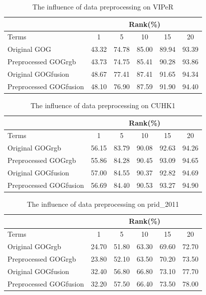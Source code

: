 \documentclass[conference,compsoc]{IEEEtran}
\begin{document}
\begin{table}[H]
\caption{The influence of data preprocessing on VIPeR}
\begin{tabular}{|l|c|c|c|c|c|}
\hline
 & \multicolumn{5}{|c|}{Rank(\%)} \\
 \hline
Terms  &1 &5 & 10 &15& 20\\
\hline
Original GOG &43.32&74.78& 85.00& 89.94& 93.39 \\
\hline
Preprocessed GOGrgb &43.73&74.75&85.41& 90.28&93.86\\
 \hline
Original GOGfusion &48.67&77.41&87.41&91.65&94.34\\
\hline
Preprocessed GOGfusion &48.10&76.90&87.59&91.90& 94.40\\
 \hline
 
\end{tabular}
\end{table}

\begin{table}[H]
\caption{The influence of data preprocessing on CUHK1}
\begin{tabular}{|l|c|c|c|c|c|}
\hline
 & \multicolumn{5}{|c|}{Rank(\%)} \\
 \hline
Terms  &1 &5 & 10 &15& 20\\
\hline
Original GOGrgb&56.15&83.79&90.08& 92.63&94.26 \\
\hline
Preprocessed GOGrgb &55.86&84.28&90.45& 93.09&94.65\\
 \hline
Original GOGfusion &57.00&84.55& 90.37& 92.82&94.69\\
\hline
Preprocessed GOGfusion &56.69&84.40& 90.53& 93.27&94.90\\
 \hline
 
\end{tabular}
\end{table}
\begin{table}[H]
\caption{The influence of data preprocessing on prid\_2011}
\begin{tabular}{|l|c|c|c|c|c|}
\hline
 & \multicolumn{5}{|c|}{Rank(\%)} \\
 \hline
Terms  &1 &5 & 10 &15& 20\\
\hline
Original GOGrgb&24.70& 51.80& 63.30& 69.60& 72.70\\
\hline
Preprocessed GOGrgb &23.80& 52.10& 63.50& 70.20& 73.50\\
\hline
Original GOGfusion &32.40& 56.80& 66.80& 73.10& 77.70\\
\hline
Preprocessed GOGfusion &32.20& 57.50& 66.40& 73.50& 78.00\\
 \hline
 
\end{tabular}
\end{table}
\end{document}
